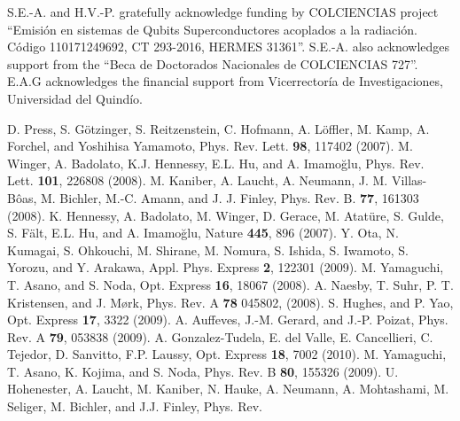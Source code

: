 \documentclass[aps,prl,showpacs,twocolumn]{revtex4}
\begin{document}
%
S.E.-A. and H.V.-P. gratefully acknowledge funding by
COLCIENCIAS project  ``Emisi\'on en sistemas de Qubits
Superconductores acoplados a la radiaci\'on. C\'odigo
110171249692, CT 293-2016, HERMES 31361''. S.E.-A. also acknowledges support from the  ``Beca de
Doctorados Nacionales de COLCIENCIAS 727''. E.A.G acknowledges the financial support from Vicerrector\'ia de Investigaciones, Universidad del Quind\'io.
%
\begin{thebibliography}{99}
 D. Press, S. G\"otzinger, S. Reitzenstein, C. Hofmann, A. L\"offler, M. Kamp, A. Forchel, and Yoshihisa Yamamoto, Phys. Rev. Lett. {\bf 98}, 117402 (2007).
 M. Winger, A. Badolato, K.J. Hennessy, E.L. Hu, and A. Imamo\u glu, Phys. Rev. Lett. {\bf 101}, 226808 (2008).
 M. Kaniber, A. Laucht, A. Neumann, J. M. Villas-B\^oas, M. Bichler, M.-C. Amann, and J. J. Finley, Phys. Rev. B. {\bf 77}, 161303 (2008).
 K. Hennessy, A. Badolato, M. Winger, D. Gerace, M. Atat\"ure, S. Gulde, S. F\"alt, E.L. Hu, and A. Imamo\u glu, Nature {\bf 445}, 896 (2007).
 Y. Ota, N. Kumagai, S. Ohkouchi, M. Shirane, M. Nomura, S. Ishida, S. Iwamoto, S. Yorozu, and Y. Arakawa, Appl. Phys. Express {\bf 2}, 122301 (2009). 
 M. Yamaguchi, T. Asano, and S. Noda, Opt. Express {\bf 16}, 18067 (2008). 
A. Naesby, T. Suhr, P. T. Kristensen, and J. M\o rk, Phys. Rev. A {\bf 78} 045802, (2008). 
 S. Hughes, and P. Yao, Opt. Express {\bf 17}, 3322 (2009). 
 A. Auffeves, J.-M. Gerard, and J.-P. Poizat, Phys. Rev. A {\bf 79}, 053838 (2009).
 A. Gonzalez-Tudela, E. del Valle, E. Cancellieri, C. Tejedor, D. Sanvitto, F.P. Laussy, Opt. Express {\bf 18}, 7002 (2010). 
 M. Yamaguchi, T. Asano, K. Kojima, and S. Noda, Phys. Rev. B {\bf 80}, 155326 (2009).
 U. Hohenester, A. Laucht, M. Kaniber, N. Hauke, A. Neumann, A. Mohtashami, M. Seliger, M. Bichler, and J.J. Finley, Phys. Rev.

\end{thebibliography}
\end{document}
